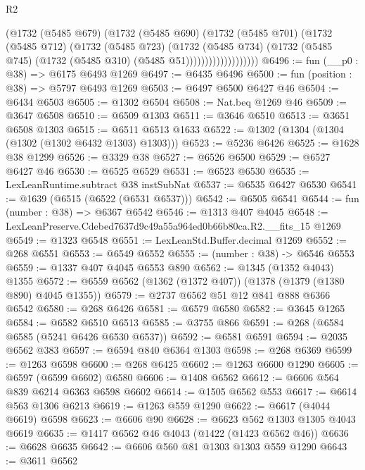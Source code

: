 \begin{lexlean}{R2}
\begin{coremodule}
                        (@1732
                          (@5485 @679)
                          (@1732
                            (@5485 @690)
                            (@1732
                              (@5485 @701)
                              (@1732
                                (@5485 @712)
                                (@1732
                                  (@5485 @723)
                                  (@1732
                                    (@5485 @734)
                                    (@1732
                                      (@5485 @745)
                                      (@1732 (@5485 @310) (@5485 @51)))))))))))))))))))
@6496 := fun (__p0 : @38) => @6175 @6493 @1269
@6497 := @6435 @6496
@6500 := fun (position : @38) => @5797 @6493 @1269
@6503 := @6497 @6500 @6427 @46
@6504 := @6434 @6503
@6505 := @1302 @6504
@6508 := Nat.beq @1269 @46
@6509 := @3647 @6508
@6510 := @6509 @1303
@6511 := @3646 @6510
@6513 := @3651 @6508 @1303
@6515 := @6511 @6513 @1633
@6522 := @1302 (@1304 (@1304 (@1302 (@1302 @6432 @1303) @1303)))
@6523 := @5236 @6426
@6525 := @1628 @38 @1299
@6526 := @3329 @38
@6527 := @6526 @6500
@6529 := @6527 @6427 @46
@6530 := @6525 @6529
@6531 := @6523 @6530
@6535 := LexLeanRuntime.subtract @38 instSubNat
@6537 := @6535 @6427 @6530
@6541 := @1639 (@6515 (@6522 (@6531 @6537)))
@6542 := @6505 @6541
@6544 := fun (number : @38) => @6367 @6542
@6546 := @1313 @407 @4045
@6548 := LexLeanPreserve.Cdebed7637d9c49a55a964ed0b66b80ca.R2.__fits_15 @1269
@6549 := @1323 @6548
@6551 := LexLeanStd.Buffer.decimal @1269
@6552 := @268 @6551
@6553 := @6549 @6552
@6555 := (number : @38) -> @6546 @6553
@6559 := @1337 @407 @4045 @6553 @890
@6562 := @1345 (@1352 @4043) @1355
@6572 := @6559 @6562 (@1362 (@1372 @407)) (@1378 (@1379 (@1380 @890) @4045 @1355))
@6579 := @2737 @6562 @51 @12 @841 @888 @6366 @6542
@6580 := @268 @6426
@6581 := @6579 @6580
@6582 := @3645 @1265
@6584 := @6582 @6510 @6513
@6585 := @3755 @866
@6591 := @268 (@6584 @6585 (@5241 @6426 @6530 @6537))
@6592 := @6581 @6591
@6594 := @2035 @6562 @383
@6597 := @6594 @840 @6364 @1303
@6598 := @268 @6369
@6599 := @1263 @6598
@6600 := @268 @6425
@6602 := @1263 @6600 @1290
@6605 := @6597 (@6599 @6602) @6580
@6606 := @1408 @6562
@6612 := @6606 @564 @839 @6214 @6363 @6598 @6602
@6614 := @1505 @6562 @553
@6617 := @6614 @563 @1306 @6213
@6619 := @1263 @559 @1290
@6622 := @6617 (@4044 @6619) @6598
@6623 := @6606 @90
@6628 := @6623 @562 @1303 @1305 @4043 @6619
@6635 := @1417 @6562 @46 @4043 (@1422 (@1423 @6562 @46))
@6636 := @6628 @6635
@6642 := @6606 @560 @81 @1303 @1303 @559 @1290
@6643 := @3611 @6562

\end{coremodule}
\end{lexlean}
